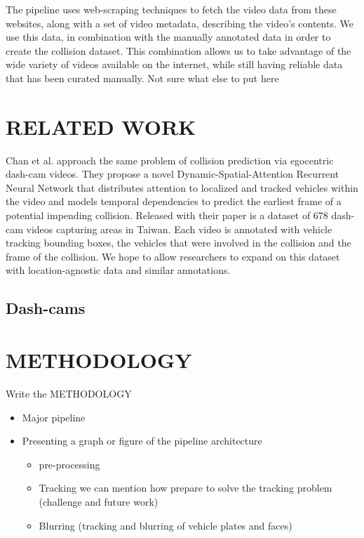 \documentclass[letterpaper, 10 pt, conference]{IEEEconf}
\newcommand{\todo}[1]{{\color{red}#1}}
\begin{document}
The pipeline uses web-scraping techniques to fetch the video data from these websites, along with a set of video metadata, describing the video's contents.
We use this data, in combination with the manually annotated data in order to create the collision dataset.
This combination allows us to take advantage of the wide variety of videos available on the internet, while still having reliable data that has been curated manually.
\todo{Not sure what else to put here}



\section{RELATED WORK}

Chan et al. \cite{chan2016anticipating} approach the same problem of collision prediction via egocentric dash-cam videos. They propose a novel Dynamic-Spatial-Attention Recurrent Neural Network that distributes attention to localized and tracked vehicles within the video and models temporal dependencies to predict the earliest frame of a potential impending collision. Released with their paper is a dataset of 678 dash-cam videos capturing areas in Taiwan. Each video is annotated with vehicle tracking bounding boxes, the vehicles that were involved in the collision and the frame of the collision. We hope to allow researchers to expand on this dataset with location-agnostic data and similar annotations.



\subsection{Dash-cams}%
\label{sub:dash_cams}







\section{METHODOLOGY}

\todo{Write the METHODOLOGY}
\begin{itemize}
  \item Major pipeline
  \item Presenting a graph or figure of the pipeline architecture
  \begin{itemize}
    \item pre-processing
    \item Tracking we can mention how prepare to solve the tracking problem (challenge and future work)
    \item Blurring (tracking and blurring of vehicle plates and faces)
  \end{itemize}
\end{itemize}
\end{document}
